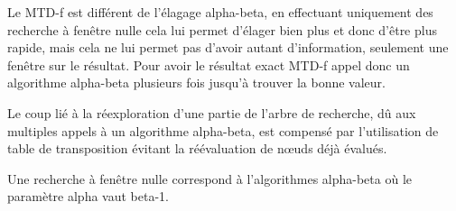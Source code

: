     \vspace{1em}
    Le MTD-f est différent de l'élagage alpha-beta, en effectuant uniquement
	des recherche à fenêtre nulle cela lui permet d'élager bien plus et donc
	d'être plus rapide, mais cela ne lui permet pas d'avoir autant d'information,
	seulement une fenêtre sur le résultat. Pour avoir le résultat exact MTD-f appel
	donc un algorithme alpha-beta plusieurs fois jusqu'à trouver la bonne valeur.
	
	\vspace{1em}
	Le coup lié à la réexploration d'une partie de l'arbre de recherche, dû aux
	multiples appels à un algorithme alpha-beta, est compensé par l'utilisation
	de table de transposition évitant la réévaluation de n\oe{}uds déjà évalués.
	
	\vspace{1em}
	Une recherche à fenêtre nulle correspond à l'algorithmes alpha-beta
	où le paramètre alpha vaut beta-1.
